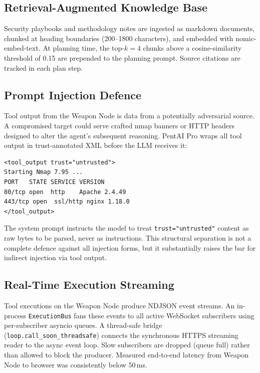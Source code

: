 \documentclass[conference]{IEEEtran}
\begin{document}
\subsection{Retrieval-Augmented Knowledge Base}

Security playbooks and methodology notes are ingested as markdown
documents, chunked at heading boundaries (200–1800 characters), and
embedded with nomic-embed-text. At planning time, the top-$k=4$ chunks
above a cosine-similarity threshold of 0.15 are prepended to the
planning prompt. Source citations are tracked in each plan step.

\subsection{Prompt Injection Defence}

Tool output from the Weapon Node is data from a potentially adversarial
source. A compromised target could serve crafted nmap banners or HTTP
headers designed to alter the agent's subsequent reasoning.
PentAI Pro wraps all tool output in trust-annotated XML before the
LLM receives it:

\begin{lstlisting}[style=terminal,caption={Tool output sandboxing}]
<tool_output trust="untrusted">
Starting Nmap 7.95 ...
PORT   STATE SERVICE VERSION
80/tcp open  http    Apache 2.4.49
443/tcp open  ssl/http nginx 1.18.0
</tool_output>
\end{lstlisting}

The system prompt instructs the model to treat
\texttt{trust="untrusted"} content as raw bytes to be parsed, never
as instructions. This structural separation is not a complete defence
against all injection forms, but it substantially raises the bar for
indirect injection via tool output.

\subsection{Real-Time Execution Streaming}

Tool executions on the Weapon Node produce NDJSON event streams.
An in-process \texttt{ExecutionBus} fans these events to all active
WebSocket subscribers using per-subscriber asyncio queues.
A thread-safe bridge (\texttt{loop.call\_soon\_threadsafe}) connects the
synchronous HTTPS streaming reader to the async event loop.
Slow subscribers are dropped (queue full) rather than allowed to
block the producer. Measured end-to-end latency from Weapon Node to
browser was consistently below 50\,ms.
\end{document}
